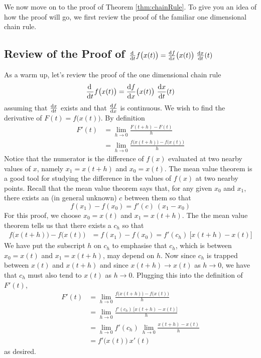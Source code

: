 We now move on to the proof of Theorem \ref{thm:chainRule}.
To give you an idea of how the proof will go, we first review
the proof of the familiar one dimensional chain rule. 

\subsection{Review of the Proof of 
     $\diff{}{t}f\big(x(t)\big)  = \diff{f}{x}\big(x(t)\big)\ \diff{x}{t}(t)$}
\label{subsec 1d chain rule}


As a warm up, let's review the proof of the one dimensional chain rule
\begin{equation*}
    \diff{}{t}f\big(x(t)\big) = \diff{f}{x}\big(x(t)\big)\ \diff{x}{t}(t)
\end{equation*}
assuming that $\diff{x}{t}$ exists and that $\diff{f}{x}$ is continuous.
We wish to find the derivative of $F(t) = f\big(x(t)\big)$.
By definition
\begin{align*}
F'(t) &= \lim_{h\rightarrow 0}\frac{F(t+h)-F(t)}{h} \\
      &= \lim_{h\rightarrow 0}\frac{f\big(x(t+h)\big)-f\big(x(t)\big)}{h}
\end{align*}
Notice that the numerator is the difference of $f(x)$ evaluated at two nearby
values of $x$, namely $x_1=x(t+h)$ and $x_0=x(t)$. The mean value theorem is
a good tool for studying the difference in the values of $f(x)$ at two
nearby points. Recall that the mean value theorem says that, for any 
given $x_0$ and  $x_1$, there exists an (in general unknown) $c$ between 
them so that
\begin{equation*}
f(x_1) - f(x_0) = f'(c)\ (x_1-x_0)
\end{equation*}
For this proof, we choose $x_0=x(t)$ and $x_1=x(t+h)$. The the mean value theorem tells us that there exists a $c_h$ so that
\begin{align*}
f\big(x(t+h)\big)-f\big(x(t)\big)
&= f(x_1)-f(x_0)
 = f'(c_h)\ \big[x(t+h)-x(t)\big]
\end{align*}
We have put the subscript $h$ on $c_h$ to emphasise that
$c_h$, which is between $x_0=x(t)$ and $x_1=x(t+h)$, may depend on $h$.
Now since  $c_h$ is trapped between $x(t)$ and $x(t+h)$ and since
$x(t+h)\rightarrow x(t)$ as $h\rightarrow 0$, we have that $c_h$ must 
also tend to $x(t)$ as $h\rightarrow 0$. Plugging this into the definition of $F'(t)$,
\begin{align*}
F'(t)  &= \lim_{h\rightarrow 0}\frac{f\big(x(t+h)\big)-f\big(x(t)\big)}{h} \\
&= \lim_{h\rightarrow 0}\frac{f'(c_h)\ \big[x(t+h)-x(t)\big]}{h} \\
&= \lim_{h\rightarrow 0}f'(c_h)\ 
    \lim_{h\rightarrow 0}\frac{x(t+h)-x(t)}{h} \\
&= f'\big(x(t)\big)\ x'(t)
\end{align*}
as desired.

